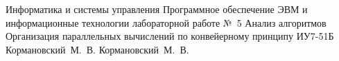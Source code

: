 
\makereporttitle
    {Информатика и системы управления} %
    {Программное обеспечение ЭВМ и информационные технологии} %
    {лабораторной работе №~5} %
    {Анализ алгоритмов} %
    {Организация параллельных вычислений по конвейерному принципу} %
    {} %
    {ИУ7-51Б} %
    {Кормановский~М.~В.} %
    {Кормановский~М.~В.} %

